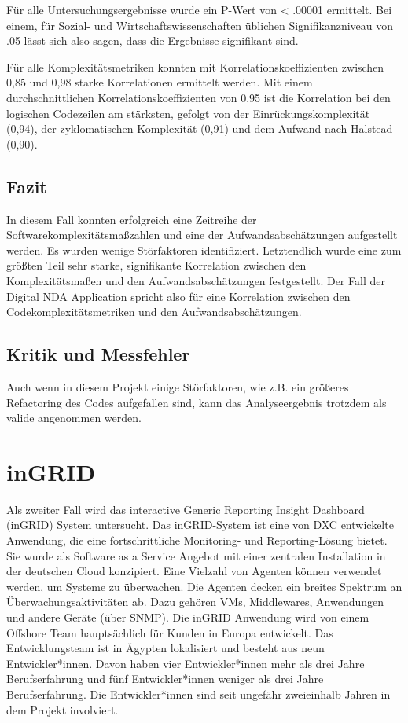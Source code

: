 Für alle Untersuchungsergebnisse wurde ein P-Wert von \textless{} .00001
ermittelt.
Bei einem, für Sozial- und Wirtschaftswissenschaften üblichen
Signifikanzniveau von .05 lässt sich also sagen, dass die Ergebnisse
signifikant sind.

Für alle Komplexitätsmetriken konnten mit Korrelationskoeffizienten
zwischen 0,85 und 0,98 starke Korrelationen ermittelt werden. Mit einem
durchschnittlichen Korrelationskoeffizienten von 0.95 ist die
Korrelation bei den logischen Codezeilen am stärksten, gefolgt von der
Einrückungskomplexität (0,94), der zyklomatischen Komplexität (0,91) und
dem Aufwand nach Halstead (0,90).

\subsection{Fazit}\label{Fazit}

In diesem Fall konnten erfolgreich eine Zeitreihe der
Softwarekomplexitätsma\ss zahlen und eine der Aufwandsabschätzungen
aufgestellt werden. Es wurden wenige Störfaktoren identifiziert.
Letztendlich wurde eine zum grö\ss ten Teil sehr starke, signifikante
Korrelation zwischen den Komplexitätsma\ss en und den Aufwandsabschätzungen
festgestellt. Der Fall der Digital \ac{NDA} Application spricht also für eine
Korrelation zwischen den Codekomplexitätsmetriken und den
Aufwandsabschätzungen.

\subsection{Kritik und Messfehler}\label{Kritik-und-Messfehler}

Auch wenn in diesem Projekt einige Störfaktoren, wie z.B. ein grö\ss eres
Refactoring des Codes aufgefallen sind, kann das Analyseergebnis
trotzdem als valide angenommen werden.

\section{inGRID}\label{ingrid}

Als zweiter Fall wird das interactive Generic Reporting Insight
Dashboard (inGRID) System untersucht. Das inGRID-System ist eine von DXC
entwickelte Anwendung, die eine fortschrittliche Monitoring- und
Reporting-Lösung bietet. Sie wurde als Software as a Service Angebot mit
einer zentralen Installation in der deutschen Cloud konzipiert. Eine
Vielzahl von Agenten können verwendet werden, um Systeme zu überwachen.
Die Agenten decken ein breites Spektrum an Überwachungsaktivitäten ab.
Dazu gehören \ac{VM}s, Middlewares, Anwendungen und andere Geräte (über
SNMP). Die inGRID Anwendung wird von einem Offshore Team hauptsächlich
für Kunden in Europa entwickelt. Das Entwicklungsteam ist in Ägypten
lokalisiert und besteht aus neun Entwickler*innen. Davon haben vier
Entwickler*innen mehr als drei Jahre Berufserfahrung und fünf
Entwickler*innen weniger als drei Jahre Berufserfahrung. Die
Entwickler*innen sind seit ungefähr zweieinhalb Jahren in dem Projekt
involviert.


